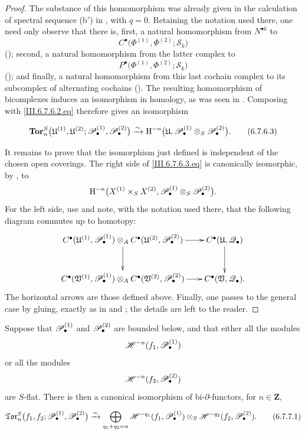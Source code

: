 \begin{proof}
The substance of this homomorphism was already given in the
calculation of spectral sequence \textnormal{(b$'$)} in
, with $q=0$.  Retaining the notation used
there, one need only observe that there is, first, a natural
homomorphism from $N^{\bullet k}$ to
\[
  C^\bullet
  \bigl(
    \Phi^{(1)},\Phi^{(2)};\mathcal S_k
  \bigr)
\]
(); second, a natural homomorphism from the
latter complex to
\[
  P^\bullet
  \bigl(
    \Phi^{(1)},\Phi^{(2)};\mathcal S_k
  \bigr)
\]
(); and finally, a natural homomorphism from
this last cochain complex to its subcomplex of alternating
cochains ().  The resulting homomorphism of
bicomplexes induces an isomorphism in homology, as was seen in
.  Composing with
\eqref{III.6.7.6.2.eq} therefore gives an isomorphism
\begin{env}[6.7.6.3]
\label{III.6.7.6.3}
\[
  \mathbf{Tor}_n^S
  \bigl(
    \mathfrak U^{(1)},\mathfrak U^{(2)};
    \sh P_\bullet^{(1)},\sh P_\bullet^{(2)}
  \bigr)
  \xrightarrow{\sim}
  \HH^{-n}
  \bigl(
    \mathfrak U,
    \sh P_\bullet^{(1)}
    \otimes_S\sh P_\bullet^{(2)}
  \bigr).
  \tag{6.7.6.3}\label{III.6.7.6.3.eq}
\]
\end{env}

It remains to prove that the isomorphism just defined is
independent of the chosen open coverings.  The right side of
\eqref{III.6.7.6.3.eq} is canonically isomorphic, by
, to
\[
  \mathrm H^{-n}
  \bigl(
    X^{(1)}\times_SX^{(2)},
    \mathscr{P}_\bullet^{(1)}
    \otimes_S\mathscr{P}_\bullet^{(2)}
  \bigr).
\]
For the left side, use  and note, with the
notation used there, that the following diagram commutes up to
homotopy:
\[
\xymatrix@C=18pt@R=28pt{
  C^\bullet(\mathfrak U^{(1)},\sh P_\bullet^{(1)})
  \otimes_A
  C^\bullet(\mathfrak U^{(2)},\sh P_\bullet^{(2)})
  \ar[r]\ar[d]
  &
  C^\bullet(\mathfrak U,\sh Q_\bullet)
  \ar[d]
  \\
  C^\bullet(\mathfrak V^{(1)},\sh P_\bullet^{(1)})
  \otimes_A
  C^\bullet(\mathfrak V^{(2)},\sh P_\bullet^{(2)})
  \ar[r]
  &
  C^\bullet(\mathfrak V,\sh Q_\bullet).
}
\]
The horizontal arrows are those defined above.  Finally, one
passes to the general case by gluing, exactly as in
 and ; the details are left to
the reader.
\end{proof}

\begin{proposition}[6.7.7]
\label{III.6.7.7}
Suppose that $\mathscr{P}_\bullet^{(1)}$ and
$\mathscr{P}_\bullet^{(2)}$ are bounded below, and that either all the
modules
\[
  \mathscr{H}^{-n}(f_1,\mathscr{P}_\bullet^{(1)})
\]
or all the modules
\[
  \mathscr{H}^{-n}(f_2,\mathscr{P}_\bullet^{(2)})
\]
are $S$-flat.  There is then a canonical isomorphism of
bi-$\partial$-functors, for $n\in\mathbf Z$,
\begin{env}[6.7.7.1]
\label{III.6.7.7.1}
\[
  \mathfrak{Tor}_n^S
  \bigl(
    f_1,f_2;
    \sh P_\bullet^{(1)},\sh P_\bullet^{(2)}
  \bigr)
  \xrightarrow{\sim}
  \bigoplus_{q_1+q_2=n}
  \sh H^{-q_1}(f_1,\sh P_\bullet^{(1)})
  \otimes_S
  \sh H^{-q_2}(f_2,\sh P_\bullet^{(2)}).
  \tag{6.7.7.1}\label{III.6.7.7.1.eq}
\]
\end{env}
\end{proposition}

